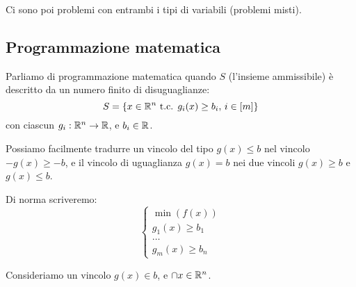 Ci sono poi problemi con entrambi i tipi di variabili (problemi misti).

\subsection{Programmazione matematica}

Parliamo di programmazione matematica quando $S$ (l'insieme ammissibile) \`e descritto da un numero finito di disuguaglianze:
\[
	S = \{ x \in \mathbb{R}^n \text{ t.c. } g_i(x) \ge b_i, \, i \in [m] \}
\]
con ciascun $g_i : \mathbb{R}^n \to \mathbb{R}$, e $b_i \in \mathbb{R}$.

Possiamo facilmente tradurre un vincolo del tipo $g(x) \le b$ nel vincolo $- g(x) \ge - b$, e il vincolo di uguaglianza $g(x) = b$ nei due vincoli $g(x) \ge b$ e $g(x) \le b$.

Di norma scriveremo:
\[
	\begin{cases}
		\min \left( f(x) \right) \\
		g_1 (x) \ge b_1 \\
		\dots \\
		g_m (x) \ge b_n
	\end{cases}
\]

Consideriamo un vincolo $g(x) \in b$, e $\cap{x} \in \mathbb{R}^n$.

